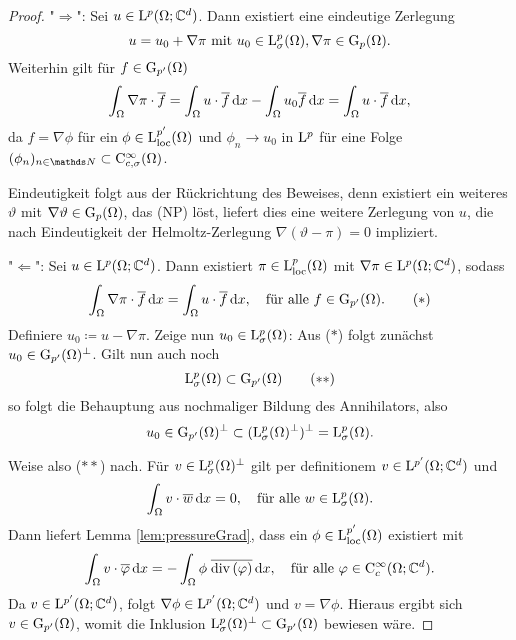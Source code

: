 \begin{proof}
  "$\Rightarrow$": Sei $u \in\mathrm{L}^p(\Omega; \mathbb{C}^d)$.
  Dann existiert eine eindeutige Zerlegung 
  $$
  u = u_0 + \nabla \pi \text{ mit } u_0 \in \mathrm{L}_\sigma^p(\Omega), \nabla\pi \in \mathrm{G}_p(\Omega).
  $$
  Weiterhin gilt für $f \in \mathrm{G}_{p'}(\Omega)$
  $$
  \int_\Omega \nabla\pi \cdot \overline f = \int_\Omega u \cdot \overline f \, {\operatorname{d}\!{x}} - \int_\Omega u_0 \overline f \, {\operatorname{d}\!{x}}  = \int_\Omega u \cdot \overline f \, {\operatorname{d}\!{x}},
  $$
  da $f = \nabla \phi$ für ein $\phi \in \mathrm{L}_{\operatorname{loc}}^{p'}(\Omega)$ und $\phi_n \to u_0$ in $\mathrm{L}^p$ für eine Folge $(\phi_n)_{n \in \N} \subset \CC_{c,\sigma}^\infty(\Omega)$.

  Eindeutigkeit folgt aus der Rückrichtung des Beweises, denn existiert ein weiteres $\vartheta$ mit $\nabla\vartheta \in \mathrm{G}_p(\Omega)$, das (NP) löst, liefert dies eine weitere Zerlegung von $u$, die nach Eindeutigkeit der Helmoltz-Zerlegung $\nabla(\vartheta - \pi) = 0$ impliziert.

  "$\Leftarrow$": Sei $u \in \mathrm{L}^p(\Omega; \mathbb{C}^d)$. Dann existiert $\pi \in \mathrm{L}^p_{\operatorname{loc}}(\Omega)$ mit $\nabla \pi \in \mathrm{L}^p(\Omega; \mathbb{C}^d)$, sodass
  \begin{displaymath}
  \int_\Omega \nabla \pi \cdot \overline f \, {\operatorname{d}\!{x}} = \int_\Omega u \cdot \overline f \, {\operatorname{d}\!{x}}, \quad\text{für alle } f \in \mathrm{G}_{p'}(\Omega).
  \tag{$\ast$}
  \end{displaymath}
  Definiere $u_0 \coloneqq u - \nabla\pi$. 
  Zeige nun $u_0 \in \mathrm{L}_\sigma^p(\Omega)$:
  Aus ($\ast$) folgt zunächst $u_0 \in \mathrm{G}_{p'}(\Omega)^\perp$.
  Gilt nun auch noch 
  \begin{displaymath}
    \mathrm{L}^p_\sigma(\Omega) \subset \mathrm{G}_{p'}(\Omega) \tag{$\ast\ast$}
  \end{displaymath}
  so folgt die Behauptung aus nochmaliger Bildung des Annihilators, also
  $$
  u_0 \in \mathrm{G}_{p'}(\Omega)^\perp \subset ( \mathrm{L}_\sigma^p(\Omega)^\perp)^\perp = \mathrm{L}^p_\sigma(\Omega).
  $$

  Weise also ($\ast\ast$) nach. Für $v \in \mathrm{L}_\sigma^p(\Omega)^\perp$ gilt per definitionem $v \in \mathrm{L}^{p'}(\Omega; \mathbb{C}^d)$ und
  $$
  \int_\Omega v \cdot \overline w \, {\operatorname{d}\!{x}} = 0, \quad\text{für alle } w \in \mathrm{L}_\sigma^p(\Omega).
  $$
  Dann liefert Lemma \ref{lem:pressureGrad}, dass ein $\phi \in \mathrm{L}_{\operatorname{loc}}^{p'}(\Omega)$ existiert mit
  $$
  \int_\Omega v \cdot \overline \varphi \, {\operatorname{d}\!{x}} = -\int_\Omega \phi \; \overline{\mathrm{div\,} (\varphi)} \, {\operatorname{d}\!{x}}, \quad\text{für alle } \varphi \in \mathrm{C}_c^\infty(\Omega; \mathbb{C}^d).
  $$
  Da $v \in \mathrm{L}^{p'}(\Omega; \mathbb{C}^d)$, folgt $\nabla \phi \in \mathrm{L}^{p'}(\Omega; \mathbb{C}^d)$ und $v = \nabla \phi$.
  Hieraus ergibt sich $v \in \mathrm{G}_{p'}(\Omega)$, womit die Inklusion $\mathrm{L}_\sigma^p(\Omega)^\perp \subset \mathrm{G}_{p'}(\Omega)$ bewiesen wäre.


\end{proof}
